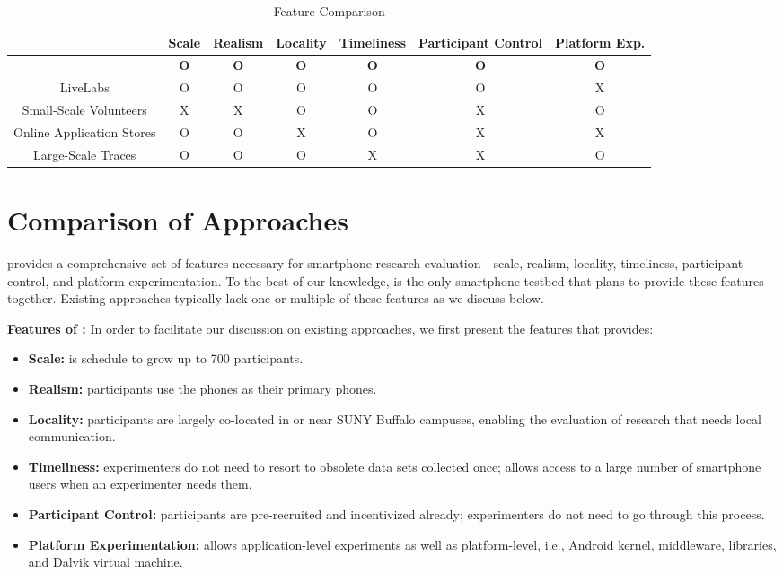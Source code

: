 \begin{table*}[t]
\centering
\begin{tabular}{|c|c|c|c|c|c|c|}
\hline
& Scale & Realism & Locality & Timeliness & Participant Control & Platform
Exp.\\
\hline
{\bf \PhoneLab{}} & {\bf O} & {\bf O} & {\bf O} & {\bf O} & {\bf O} & {\bf O}\\
LiveLabs{} & O & O & O & O & O & X\\
Small-Scale Volunteers & X & X & O & O & X & O\\
Online Application Stores & O & O & X & O & X & X\\
Large-Scale Traces & O & O & O & X & X & O\\
\hline
\end{tabular}
\caption{Feature Comparison}
\label{tab:comparison}
\end{table*}

\section{Comparison of Approaches}
\label{sec:comparison}

\PhoneLab{} provides a comprehensive set of features necessary for smartphone
research evaluation---scale, realism, locality, timeliness, participant control,
and platform experimentation. To the best of our knowledge, \PhoneLab{} is the
only smartphone testbed that plans to provide these features together. Existing
approaches typically lack one or multiple of these features as we discuss below.

{\bf Features of \PhoneLab{}:} In order to facilitate our discussion on existing
approaches, we first present the features that \PhoneLab{} provides:

\begin{itemize}[nosep]
\item {\bf Scale:} \PhoneLab{} is schedule to grow up to 700 participants.
\item {\bf Realism:} \PhoneLab{} participants use the phones as their primary
phones.
\item {\bf Locality:} \PhoneLab{} participants are largely co-located in or near
SUNY Buffalo campuses, enabling the evaluation of research that needs local
communication.
\item {\bf Timeliness:} \PhoneLab{} experimenters do not need to resort to
obsolete data sets collected once; \PhoneLab{} allows access to a large number
of smartphone users when an experimenter needs them.
\item {\bf Participant Control:} \PhoneLab{} participants are pre-recruited and
incentivized already; experimenters do not need to go through this process.
\item {\bf Platform Experimentation:} \PhoneLab{} allows application-level
experiments as well as platform-level, i.e., Android kernel, middleware,
libraries, and Dalvik virtual machine.
\end{itemize}

